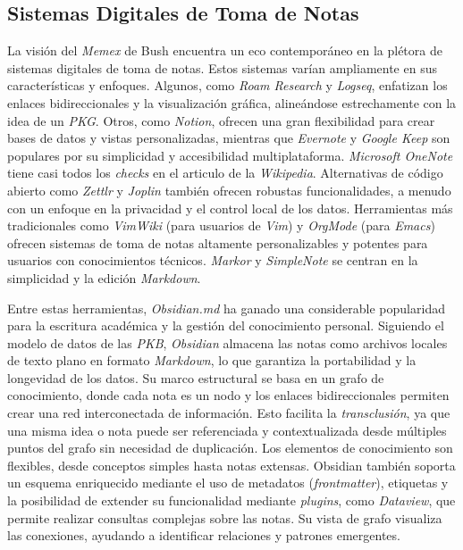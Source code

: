 \subsection{Sistemas Digitales de Toma de Notas}
\label{subsec:sistemas_digitales_toma_notas}
La visión del \textit{Memex} de Bush encuentra un eco contemporáneo en la plétora de sistemas digitales de toma de notas. Estos sistemas varían ampliamente en sus características y enfoques. Algunos, como \textit{Roam Research} y \textit{Logseq}, enfatizan los enlaces bidireccionales y la visualización gráfica, alineándose estrechamente con la idea de un \textit{PKG}. Otros, como \textit{Notion}, ofrecen una gran flexibilidad para crear bases de datos y vistas personalizadas, mientras que \textit{Evernote} y \textit{Google Keep} son populares por su simplicidad y accesibilidad multiplataforma. \textit{Microsoft OneNote} tiene casi todos los \textit{checks} en el articulo de la \textit{Wikipedia}. Alternativas de código abierto como \textit{Zettlr} y \textit{Joplin} también ofrecen robustas funcionalidades, a menudo con un enfoque en la privacidad y el control local de los datos. Herramientas más tradicionales como \textit{VimWiki} (para usuarios de \textit{Vim}) y \textit{OrgMode} (para \textit{Emacs}) ofrecen sistemas de toma de notas altamente personalizables y potentes para usuarios con conocimientos técnicos. \textit{Markor} y \textit{SimpleNote} se centran en la simplicidad y la edición \textit{Markdown}.

Entre estas herramientas, \textit{Obsidian.md} ha ganado una considerable popularidad para la escritura académica y la gestión del conocimiento personal. Siguiendo el modelo de datos de las \textit{PKB}, \textit{Obsidian} almacena las notas como archivos locales de texto plano en formato \textit{Markdown}, lo que garantiza la portabilidad y la longevidad de los datos. Su marco estructural se basa en un grafo de conocimiento, donde cada nota es un nodo y los enlaces bidireccionales permiten crear una red interconectada de información. Esto facilita la \textit{transclusión}, ya que una misma idea o nota puede ser referenciada y contextualizada desde múltiples puntos del grafo sin necesidad de duplicación. Los elementos de conocimiento son flexibles, desde conceptos simples hasta notas extensas. Obsidian también soporta un esquema enriquecido mediante el uso de metadatos (\textit{frontmatter}), etiquetas y la posibilidad de extender su funcionalidad mediante \textit{plugins}, como \textit{Dataview}, que permite realizar consultas complejas sobre las notas. Su vista de grafo visualiza las conexiones, ayudando a identificar relaciones y patrones emergentes.

